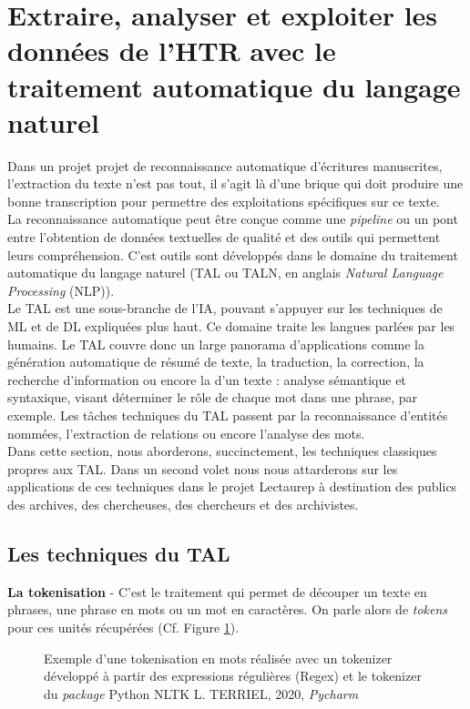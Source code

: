 \section{Extraire, analyser et exploiter les données de l'HTR avec le traitement automatique du langage naturel}\label{TAL_repertoire}

Dans un projet projet de reconnaissance automatique d'écritures manuscrites, l'extraction du texte n'est pas tout, il s'agit là d'une brique qui doit produire une bonne transcription pour permettre des exploitations spécifiques sur ce texte.\\

La reconnaissance automatique peut être conçue comme une \textit{pipeline} ou un pont entre l'obtention de données textuelles de qualité et des outils qui permettent leurs compréhension. C'est outils sont développés dans le domaine du traitement automatique du langage naturel (TAL ou TALN, en anglais \textit{Natural Language Processing} (NLP)).\\

Le TAL est une sous-branche de l'IA, pouvant s'appuyer sur les techniques de ML et de DL expliquées plus haut. Ce domaine traite les langues parlées par les humains. Le TAL couvre donc un large panorama d'applications comme la génération automatique de résumé de texte, la traduction, la correction, la recherche d'information ou encore la  d'un texte : analyse sémantique et syntaxique, visant déterminer le rôle de chaque mot dans une phrase, par exemple. Les tâches techniques du TAL passent par la reconnaissance d'entités nommées, l'extraction de relations ou encore l'analyse des mots.\\

Dans cette section, nous aborderons, succinctement, les techniques classiques propres aux TAL. Dans un second volet nous nous attarderons sur les applications de ces techniques dans le projet Lectaurep à destination des publics des archives, des chercheuses, des chercheurs et des archivistes.
\newpage
\subsection{Les techniques du TAL}

\textbf{La tokenisation} - C'est le traitement qui permet de découper un texte en phrases, une phrase en mots ou un mot en caractères. On parle alors de \textit{tokens} pour ces unités récupérées (Cf. Figure \ref{fig:tokenisation}). 
\begin{figure}[h!]
    \centering
    \centerline{}
    \caption{Exemple d'une tokenisation en mots réalisée avec un tokenizer développé à partir des expressions régulières (Regex) et le tokenizer du \textit{package} Python NLTK \textcopyright L. TERRIEL, 2020, \textit{Pycharm}}
    \label{fig:tokenisation}
\end{figure}

